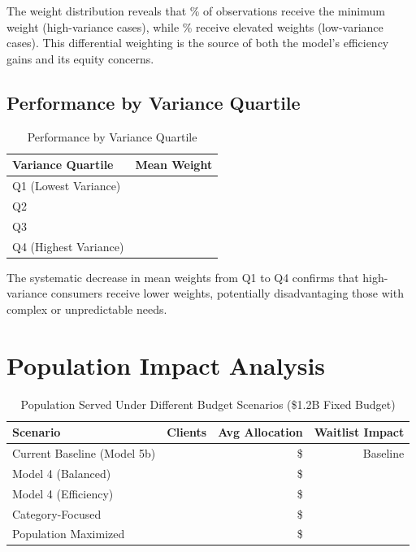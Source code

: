 The weight distribution reveals that \ModelFourWeightAtMinPct{}\% of observations receive the minimum weight (high-variance cases), while \ModelFourWeightAboveThreePct{}\% receive elevated weights (low-variance cases). This differential weighting is the source of both the model's efficiency gains and its equity concerns.

\subsection{Performance by Variance Quartile}

\begin{table}[h]
\centering
\caption{Performance by Variance Quartile}
\begin{tabular}{lc}
\toprule
\textbf{Variance Quartile} & \textbf{Mean Weight} \\
\midrule
Q1 (Lowest Variance) & \ModelFourVarQOneMeanWeight{} \\
Q2 & \ModelFourVarQTwoMeanWeight{} \\
Q3 & \ModelFourVarQThreeMeanWeight{} \\
Q4 (Highest Variance) & \ModelFourVarQFourMeanWeight{} \\
\bottomrule
\end{tabular}
\end{table}

The systematic decrease in mean weights from Q1 to Q4 confirms that high-variance consumers receive lower weights, potentially disadvantaging those with complex or unpredictable needs.

\section{Population Impact Analysis}

\begin{table}[h]
\centering
\caption{Population Served Under Different Budget Scenarios (\$1.2B Fixed Budget)}
\begin{tabular}{lrrr}
\toprule
\textbf{Scenario} & \textbf{Clients} & \textbf{Avg Allocation} & \textbf{Waitlist Impact} \\
\midrule
Current Baseline (Model 5b) & \ModelFourPopcurrentbaselineClients{} & \$\ModelFourPopcurrentbaselineAvgAlloc{} & Baseline \\
Model 4 (Balanced) & \ModelFourPopmodelbalancedClients{} & \$\ModelFourPopmodelbalancedAvgAlloc{} & \ModelFourPopmodelbalancedWaitlistChange{} \\
Model 4 (Efficiency) & \ModelFourPopmodelefficiencyClients{} & \$\ModelFourPopmodelefficiencyAvgAlloc{} & \ModelFourPopmodelefficiencyWaitlistChange{} \\
Category-Focused & \ModelFourPopcategoryfocusedClients{} & \$\ModelFourPopcategoryfocusedAvgAlloc{} & \ModelFourPopcategoryfocusedWaitlistChange{} \\
Population Maximized & \ModelFourPoppopulationmaximizedClients{} & \$\ModelFourPoppopulationmaximizedAvgAlloc{} & \ModelFourPoppopulationmaximizedWaitlistChange{} \\
\bottomrule
\end{tabular}
\end{table}

